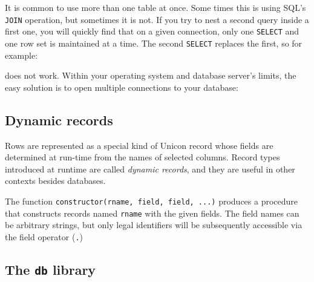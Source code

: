 It is common to use more than one table at once. Some times this is
using SQL's \texttt{JOIN} operation, but sometimes it
is not. If you try to nest a second query inside a first one, you will
quickly find that on a given connection, only one \texttt{SELECT} and
one row set is maintained at a time. The second \texttt{SELECT}
replaces the first, so for example:


\noindent
does not work. Within your operating system and database
server's limits, the easy solution is to open multiple
connections to your database:


\subsection*{Dynamic records}

Rows are represented as a special kind of Unicon record whose
fields are determined at run-time from the names
of selected columns. Record types introduced at runtime
are called \textit{dynamic records}, and they are useful in other
contexts besides databases.

The function \texttt{constructor(rname, field, field, ...)} produces a
procedure that constructs records named
\texttt{rname} with the given fields. The field names
can be arbitrary strings, but only legal identifiers
will be subsequently accessible via the field operator (\texttt{.})

\subsection*{The \texttt{db} library}

